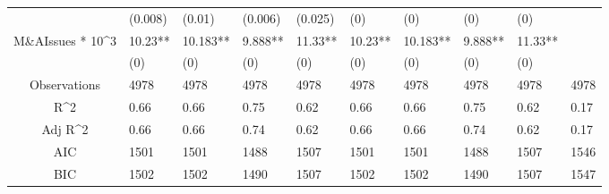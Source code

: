 \documentclass{article}
\begin{document}
\begin{table}[H]
\begin{tabular}{|clllllllll|}
   & (0.008) & (0.01) & (0.006) & (0.025) & (0) & (0) & (0) & (0) &  \\ 
  M\&AIssues * 10^3 & 10.23** & 10.183** & 9.888** & 11.33** & 10.23** & 10.183** & 9.888** & 11.33** &  \\ 
   & (0) & (0) & (0) & (0) & (0) & (0) & (0) & (0) &  \\ 
  \hline 
 Observations & 4978 & 4978 & 4978 & 4978 & 4978 & 4978 & 4978 & 4978 & 4978 \\ 
  R^2 & 0.66 & 0.66 & 0.75 & 0.62 & 0.66 & 0.66 & 0.75 & 0.62 & 0.17 \\ 
  Adj R^2 & 0.66 & 0.66 & 0.74 & 0.62 & 0.66 & 0.66 & 0.74 & 0.62 & 0.17 \\ 
  AIC & 1501 & 1501 & 1488 & 1507 & 1501 & 1501 & 1488 & 1507 & 1546 \\ 
  BIC & 1502 & 1502 & 1490 & 1507 & 1502 & 1502 & 1490 & 1507 & 1547 \\ 
   \hline
\end{tabular}
 
\end{table}
\end{document}
